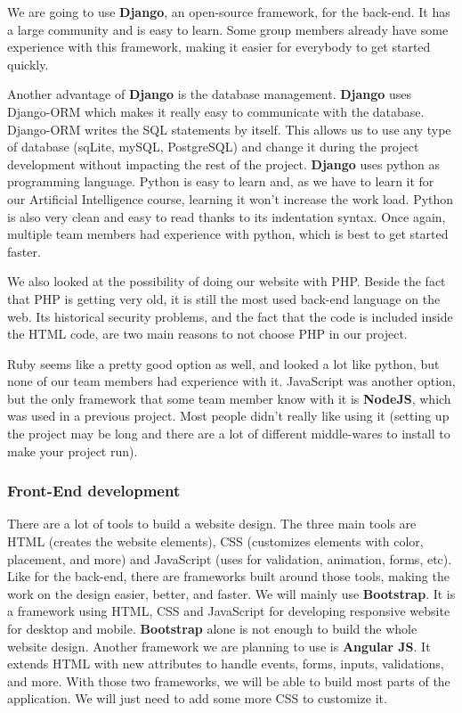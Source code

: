 We are going to use \textbf{Django}, an open-source framework, for the back-end. It has a large community and is easy to learn. Some group members already have some experience with this framework, making it easier for everybody to get started quickly.\newline

Another advantage of \textbf{Django} is the database management. \textbf{Django} uses Django-ORM which makes it really easy to communicate with the database. Django-ORM writes the SQL statements by itself. This allows us to use any type of database (sqLite, mySQL, PostgreSQL) and change it during the project development without impacting the rest of the project.
\textbf{Django} uses python as programming language. Python is easy to learn and, as we have to learn it for our Artificial Intelligence course, learning it won't increase the work load.
Python is also very clean and easy to read thanks to its indentation syntax. Once again, multiple team members had experience with python, which is best to get started faster.\newline

We also looked at the possibility of doing our website with PHP. Beside the fact that PHP is getting very old, it is still the most used back-end language on the web. Its historical security problems, and the fact that the code is included inside the HTML code, are two main reasons to not choose PHP in our project.\newline

Ruby seems like a pretty good option as well, and looked a lot like python, but none of our team members had experience with it. JavaScript was another option, but the only framework that some team member know with it is \textbf{NodeJS}, which was used in a previous project. Most people didn't really like using it (setting up the project may be long and there are a lot of different middle-wares to install to make your project run).

\subsubsection{Front-End development}

There are a lot of tools to build a website design. The three main tools are HTML (creates the website elements), CSS (customizes elements with color, placement, and more) and JavaScript (uses for validation, animation, forms, etc). Like for the back-end, there are frameworks built around those tools, making the work on the design easier, better, and faster. We will mainly use \textbf{Bootstrap}. It is a framework using HTML, CSS and JavaScript for developing responsive website for desktop and mobile. \textbf{Bootstrap} alone is not enough to build the whole website design. Another framework we are planning to use is \textbf{Angular JS}. It extends HTML with new attributes to handle events, forms, inputs, validations, and more. With those two frameworks, we will be able to build most parts of the application. We will just need to add some more CSS to customize it.

